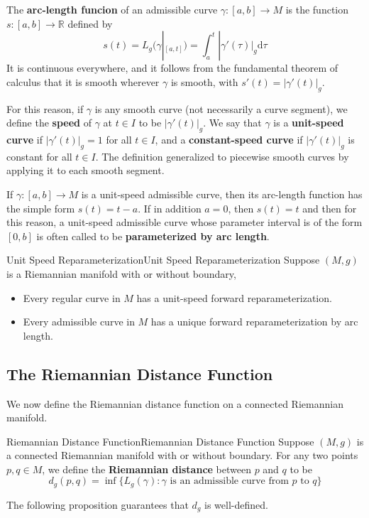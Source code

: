 \documentclass[../main.tex]{subfiles}
\begin{document}
The \textbf{arc-length funcion} of an admissible curve $\gamma: [a, b] \to M$ is the function $s: [a, b] \to \mathbb{R}$ defined by
\begin{equation}
	s(t) = L_g(\gamma|_{[a, t]}) = \int_a^t |\gamma'(\tau)|_g \mathrm{d}\tau
\end{equation}
It is continuous everywhere, and it follows from the fundamental theorem of calculus that it is smooth wherever $\gamma$ is smooth, with $s'(t) = |\gamma'(t)|_g$.

For this reason, if $\gamma$ is any smooth curve (not necessarily a curve segment), we define the \textbf{speed} of $\gamma$ at $t \in I$ to be $|\gamma'(t)|_g$. We say that $\gamma$ is a \textbf{unit-speed curve} if $|\gamma'(t)|_g = 1$ for all $t \in I$, and a \textbf{constant-speed curve} if $|\gamma'(t)|_g$ is constant for all $t \in I$. The definition generalized to piecewise smooth curves by applying it to each smooth segment.

If $\gamma: [a, b] \to M$ is a unit-speed admissible curve, then its arc-length function has the simple form $s(t) = t - a$. If in addition $a=0$, then $s(t) = t$ and then for this reason, a unit-speed admissible curve whose parameter interval is of the form $[0, b]$ is often called to be \textbf{parameterized by arc length}.

\begin{proposition}{Unit Speed Reparameterization}{Unit Speed Reparameterization}
	Suppose $(M, g)$ is a Riemannian manifold with or without boundary,
	\begin{itemize}
		\item Every regular curve in $M$ has a unit-speed forward reparameterization.
		\item Every admissible curve in $M$ has a unique forward reparameterization by arc length.
	\end{itemize}
\end{proposition}

\subsection{The Riemannian Distance Function}
We now define the Riemannian distance function on a connected Riemannian manifold.

\begin{definition}{Riemannian Distance Function}{Riemannian Distance Function}
	Suppose $(M, g)$ is a connected Riemannian manifold with or without boundary. For any two points $p, q \in M$, we define the \textbf{Riemannian distance} between $p$ and $q$ to be
	\begin{equation}
		d_g(p, q) = \inf \{ L_g(\gamma) : \gamma \text{ is an admissible curve from } p \text{ to } q \}
	\end{equation}
\end{definition}
The following proposition guarantees that $d_g$ is well-defined.
\end{document}
